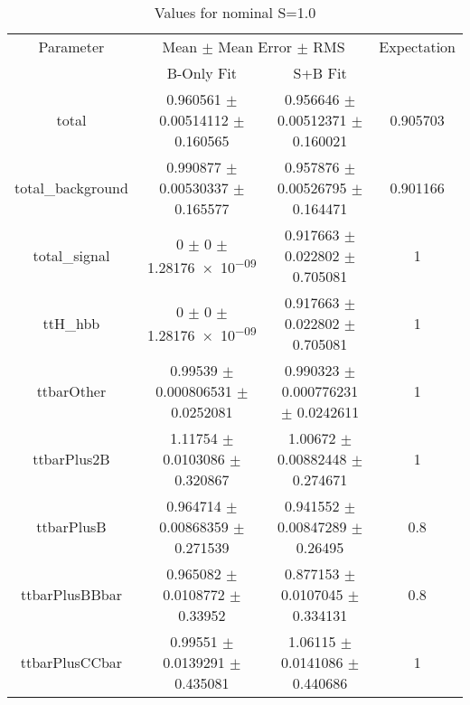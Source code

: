 \begin{table}
\centering
\caption{Values for nominal S=1.0}
\begin{tabular}{cccc}
\toprule
Parameter & \multicolumn{2}{c}{Mean $\pm$ Mean Error $\pm$ RMS} & Expectation\\
 & B-Only Fit & S+B Fit & \\
\midrule
total & \num{0.960561} $\pm$ \num{0.00514112} $\pm$ \num{0.160565} & \num{0.956646} $\pm$ \num{0.00512371} $\pm$ \num{0.160021} & \num{0.905703}\\
total\_background & \num{0.990877} $\pm$ \num{0.00530337} $\pm$ \num{0.165577} & \num{0.957876} $\pm$ \num{0.00526795} $\pm$ \num{0.164471} & \num{0.901166}\\
total\_signal & \num{0} $\pm$ \num{0} $\pm$ \num{1.28176e-09} & \num{0.917663} $\pm$ \num{0.022802} $\pm$ \num{0.705081} & \num{1}\\
ttH\_hbb & \num{0} $\pm$ \num{0} $\pm$ \num{1.28176e-09} & \num{0.917663} $\pm$ \num{0.022802} $\pm$ \num{0.705081} & \num{1}\\
ttbarOther & \num{0.99539} $\pm$ \num{0.000806531} $\pm$ \num{0.0252081} & \num{0.990323} $\pm$ \num{0.000776231} $\pm$ \num{0.0242611} & \num{1}\\
ttbarPlus2B & \num{1.11754} $\pm$ \num{0.0103086} $\pm$ \num{0.320867} & \num{1.00672} $\pm$ \num{0.00882448} $\pm$ \num{0.274671} & \num{1}\\
ttbarPlusB & \num{0.964714} $\pm$ \num{0.00868359} $\pm$ \num{0.271539} & \num{0.941552} $\pm$ \num{0.00847289} $\pm$ \num{0.26495} & \num{0.8}\\
ttbarPlusBBbar & \num{0.965082} $\pm$ \num{0.0108772} $\pm$ \num{0.33952} & \num{0.877153} $\pm$ \num{0.0107045} $\pm$ \num{0.334131} & \num{0.8}\\
ttbarPlusCCbar & \num{0.99551} $\pm$ \num{0.0139291} $\pm$ \num{0.435081} & \num{1.06115} $\pm$ \num{0.0141086} $\pm$ \num{0.440686} & \num{1}\\
\bottomrule
\end{tabular}
\end{table}
